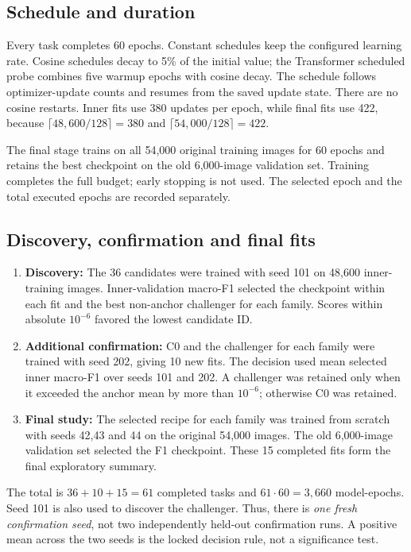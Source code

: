 \subsection{Schedule and duration}
Every task completes 60 epochs. Constant schedules keep the configured learning rate. Cosine schedules decay to 5\% of the initial value; the Transformer scheduled probe combines five warmup epochs with cosine decay. The schedule follows optimizer-update counts and resumes from the saved update state. There are no cosine restarts. Inner fits use 380 updates per epoch, while final fits use 422, because $\lceil48,600/128\rceil=380$ and $\lceil54,000/128\rceil=422$.

The final stage trains on all 54,000 original training images for 60 epochs and retains the best checkpoint on the old 6,000-image validation set. Training completes the full budget; early stopping is not used. The selected epoch and the total executed epochs are recorded separately.

\clearpage
\subsection{Discovery, confirmation and final fits}
\begin{enumerate}
\item \textbf{Discovery:} The 36 candidates were trained with seed 101 on 48,600 inner-training images. Inner-validation macro-F1 selected the checkpoint within each fit and the best non-anchor challenger for each family. Scores within absolute $10^{-6}$ favored the lowest candidate ID.
\item \textbf{Additional confirmation:} C0 and the challenger for each family were trained with seed 202, giving 10 new fits. The decision used mean selected inner macro-F1 over seeds 101 and 202. A challenger was retained only when it exceeded the anchor mean by more than $10^{-6}$; otherwise C0 was retained.
\item \textbf{Final study:} The selected recipe for each family was trained from scratch with seeds 42,43 and 44 on the original 54,000 images. The old 6,000-image validation set selected the F1 checkpoint. These 15 completed fits form the final exploratory summary.
\end{enumerate}
The total is $36+10+15=61$ completed tasks and $61\cdot60=3,660$ model-epochs. Seed 101 is also used to discover the challenger. Thus, there is \emph{one fresh confirmation seed}, not two independently held-out confirmation runs. A positive mean across the two seeds is the locked decision rule, not a significance test.

